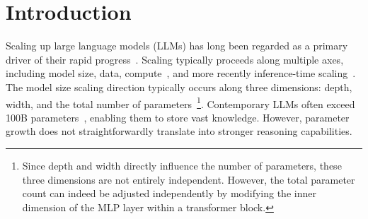 \documentclass{article} %
\begin{document}
\section{Introduction}
Scaling up large language models (LLMs) has long been regarded as a primary driver of their rapid progress~\citep{Kaplan2020Scaling, Hoffmann2022Chinchilla, Brown2020GPT3, Wei2022Emergent}. Scaling typically proceeds along multiple axes, including model size, data, compute~\citep{Wei2022Emergent}, and more recently inference-time scaling~\citep{snell2024scaling, jaech2024openai}. 
The model size scaling direction typically occurs along three dimensions: depth, width, and the total number of parameters~\footnote{Since depth and width directly influence the number of parameters, these three dimensions are not entirely independent. However, the total parameter count can indeed be adjusted independently by modifying the inner dimension of the MLP layer within a transformer block.}. 
Contemporary LLMs often exceed 100B parameters~\citep{Wei2022Emergent}, enabling them to store vast knowledge. However, parameter growth does not straightforwardly translate into stronger reasoning capabilities.

\end{document}
